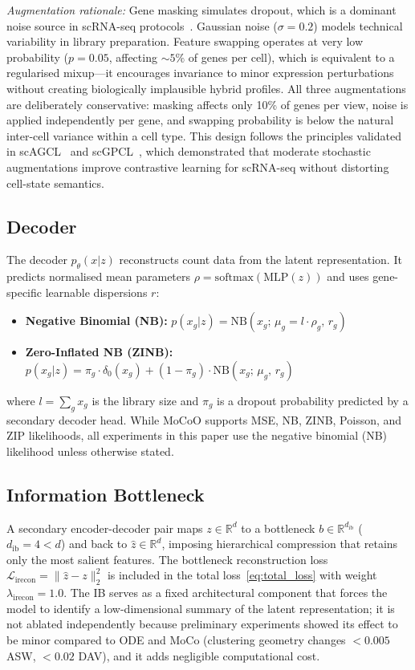 \documentclass[journal]{IEEEtran}
\begin{document}
\textit{Augmentation rationale:} Gene masking simulates dropout, which is a dominant noise source in scRNA-seq protocols~\cite{hicks2018missing}. Gaussian noise ($\sigma{=}0.2$) models technical variability in library preparation. Feature swapping operates at very low probability ($p{=}0.05$, affecting ${\sim}5\%$ of genes per cell), which is equivalent to a regularised mixup---it encourages invariance to minor expression perturbations without creating biologically implausible hybrid profiles. All three augmentations are deliberately conservative: masking affects only 10\% of genes per view, noise is applied independently per gene, and swapping probability is below the natural inter-cell variance within a cell type. This design follows the principles validated in scAGCL~\cite{cai2024scagcl} and scGPCL~\cite{cai2024scgpcl}, which demonstrated that moderate stochastic augmentations improve contrastive learning for scRNA-seq without distorting cell-state semantics.

\subsection{Decoder}
\label{sec:method:decoder}

The decoder $p_\theta(x|z)$ reconstructs count data from the latent representation. It predicts normalised mean parameters $\rho = \mathrm{softmax}(\mathrm{MLP}(z))$ and uses gene-specific learnable dispersions $r$:
\begin{itemize}
    \item \textbf{Negative Binomial (NB):} $p(x_g | z) = \mathrm{NB}(x_g;\, \mu_g = l \cdot \rho_g,\, r_g)$
    \item \textbf{Zero-Inflated NB (ZINB):} $p(x_g | z) = \pi_g \cdot \delta_0(x_g) + (1 - \pi_g) \cdot \mathrm{NB}(x_g;\, \mu_g,\, r_g)$
\end{itemize}
where $l = \sum_g x_g$ is the library size and $\pi_g$ is a dropout probability predicted by a secondary decoder head. While MoCoO supports MSE, NB, ZINB, Poisson, and ZIP likelihoods, all experiments in this paper use the negative binomial (NB) likelihood unless otherwise stated.

\subsection{Information Bottleneck}
\label{sec:method:ib}

A secondary encoder-decoder pair maps $z \in \mathbb{R}^{d}$ to a bottleneck $b \in \mathbb{R}^{d_{\mathrm{ib}}}$ ($d_{\mathrm{ib}} = 4 < d$) and back to $\hat{z} \in \mathbb{R}^{d}$, imposing hierarchical compression that retains only the most salient features. The bottleneck reconstruction loss $\mathcal{L}_{\mathrm{irecon}} = \|\hat{z} - z\|_2^2$ is included in the total loss~\eqref{eq:total_loss} with weight $\lambda_{\mathrm{irecon}} = 1.0$. The IB serves as a fixed architectural component that forces the model to identify a low-dimensional summary of the latent representation; it is not ablated independently because preliminary experiments showed its effect to be minor compared to ODE and MoCo (clustering geometry changes $< 0.005$ ASW, $< 0.02$ DAV), and it adds negligible computational cost.
\end{document}
